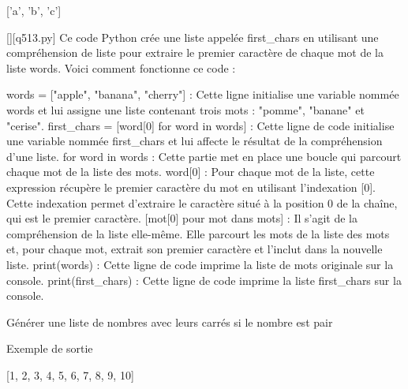 ['a', 'b', 'c']
        \par
        \begin{solution}
            \renewcommand{\nomfichier}{q513.py}
            \pythonfile{\chemincode \nomfichier}[][\nomfichier]
            Ce code Python crée une liste appelée first\_chars en utilisant une compréhension de liste pour extraire le premier caractère de chaque mot de la liste words. Voici comment fonctionne ce code :

    words = ["apple", "banana", "cherry"] : Cette ligne initialise une variable nommée words et lui assigne une liste contenant trois mots : "pomme", "banane" et "cerise".
    first\_chars = [word[0] for word in words] : Cette ligne de code initialise une variable nommée first\_chars et lui affecte le résultat de la compréhension d'une liste.
        for word in words : Cette partie met en place une boucle qui parcourt chaque mot de la liste des mots.
        word[0] : Pour chaque mot de la liste, cette expression récupère le premier caractère du mot en utilisant l'indexation [0]. Cette indexation permet d'extraire le caractère situé à la position 0 de la chaîne, qui est le premier caractère.
        [mot[0] pour mot dans mots] : Il s'agit de la compréhension de la liste elle-même. Elle parcourt les mots de la liste des mots et, pour chaque mot, extrait son premier caractère et l'inclut dans la nouvelle liste.
    print(words) : Cette ligne de code imprime la liste de mots originale sur la console.
    print(first\_chars) : Cette ligne de code imprime la liste first\_chars sur la console.
        \end{solution}
        

        \question
        Générer une liste de nombres avec leurs carrés si le nombre est pair

Exemple de sortie

[1, 2, 3, 4, 5, 6, 7, 8, 9, 10]

